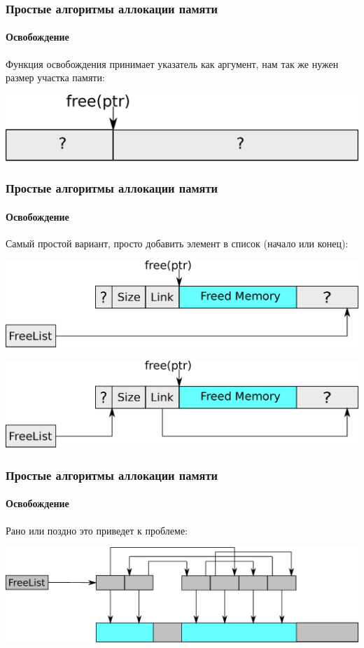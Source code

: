 \begin{frame}
\frametitle{Простые алгоритмы аллокации памяти}
\framesubtitle{Освобождение}

Функция освобождения принимает указатель как аргумент, нам так же нужен размер участка памяти:

\includegraphics[width=.9\linewidth]{alloc-free0}


\end{frame}

\begin{frame}
\frametitle{Простые алгоритмы аллокации памяти}
\framesubtitle{Освобождение}

Самый простой вариант, просто добавить элемент в список (начало или конец):

\includegraphics[width=.9\linewidth]{alloc-free2}

\includegraphics[width=.9\linewidth]{alloc-free3}

\end{frame}

\begin{frame}
\frametitle{Простые алгоритмы аллокации памяти}
\framesubtitle{Освобождение}

Рано или поздно это приведет к проблеме:

\includegraphics[width=.9\linewidth]{alloc-free4}

\end{frame}

